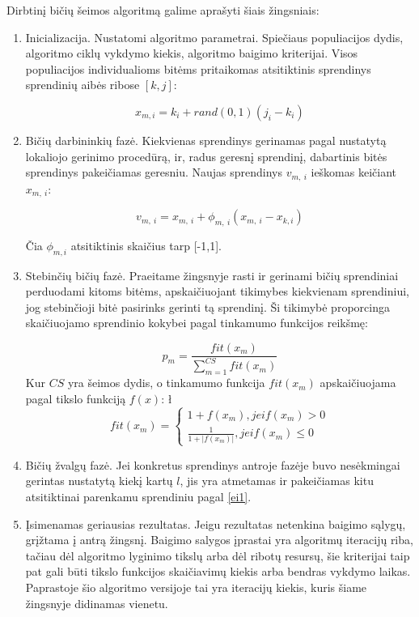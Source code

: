\documentclass{VUMIFKompMagistrinis}
\begin{document}
Dirbtinį bičių šeimos algoritmą galime aprašyti šiais žingsniais:

\begin{enumerate}
    \item	Inicializacija. Nustatomi algoritmo parametrai. Spiečiaus populiacijos dydis, algoritmo ciklų vykdymo kiekis, algoritmo baigimo kriterijai. Visos populiacijos individualioms bitėms pritaikomas atsitiktinis sprendinys sprendinių aibės ribose $[k,j]$:

\begin{equation}\label{ei1}
x_{m,i}=k_{i}+rand(0,1)(j_{i}-k_{i})
\end{equation}


    \item 	Bičių darbininkių fazė. Kiekvienas sprendinys gerinamas pagal nustatytą lokaliojo gerinimo procedūrą, ir, radus geresnį sprendinį, dabartinis bitės sprendinys pakeičiamas geresniu. Naujas sprendinys $v_{m,\ i}$   ieškomas keičiant $x_{m,\ i}$:

\begin{equation}\label{eebp1}
v_{m,\ i}=x_{m,\ i} +\phi_{m,\ i} (x_{m,\ i} -x_{k,i} )
\end{equation}

Čia $\phi_{m,i}$ atsitiktinis skaičius tarp [-1,1].

    \item 	Stebinčių bičių fazė. Praeitame žingsnyje rasti ir gerinami bičių sprendiniai perduodami kitoms bitėms, apskaičiuojant tikimybes kiekvienam sprendiniui, jog stebinčioji bitė pasirinks gerinti tą sprendinį. Ši tikimybė proporcinga skaičiuojamo sprendinio kokybei pagal tinkamumo funkcijos reikšmę:

\begin{equation}
\label{eobp1}
p_m=\frac{fit(x_m)}{\sum_{m=1}^{CS}{fit(x_m)}}
\end{equation}
Kur $CS$ yra šeimos dydis, o tinkamumo funkcija $fit(x_m)$ apskaičiuojama pagal tikslo funkciją $f(x)$:
\l \begin{equation}\label{efit}
fit(x_m)=
\begin{cases}
1+f(x_m), jei f(x_m)>0\\
\frac{1}{1+|f(x_m)|}, jei f(x_m)\leq0
\end{cases}
\end{equation}


    \item 	Bičių žvalgų fazė. Jei konkretus sprendinys antroje fazėje buvo nesėkmingai gerintas nustatytą kiekį kartų $l$, jis yra atmetamas ir pakeičiamas kitu atsitiktinai parenkamu sprendiniu pagal \eqref{ei1}.

    \item 	Įsimenamas geriausias rezultatas. Jeigu rezultatas netenkina baigimo sąlygų, grįžtama į antrą žingsnį. Baigimo salygos įprastai yra algoritmų iteracijų riba, tačiau dėl algoritmo lyginimo tikslų arba dėl ribotų resursų, šie kriterijai taip pat gali būti tikslo funkcijos skaičiavimų kiekis arba bendras vykdymo laikas. Paprastoje šio algoritmo versijoje tai yra iteracijų kiekis, kuris šiame žingsnyje didinamas vienetu.

\end{enumerate}
\end{document}
